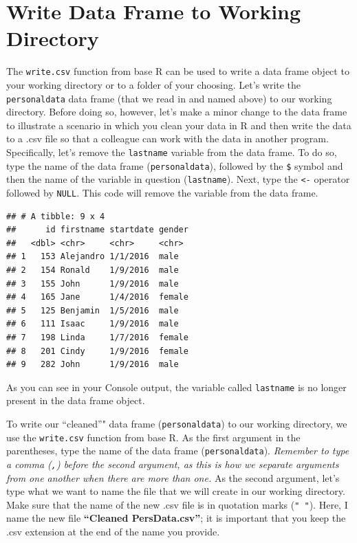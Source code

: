 \documentclass[]{book}
\newenvironment{Shaded}{\begin{snugshade}}{\end{snugshade}}
\newcommand{\StringTok}[1]{\textcolor[rgb]{0.31,0.60,0.02}{#1}}
\newcommand{\CommentTok}[1]{\textcolor[rgb]{0.56,0.35,0.01}{\textit{#1}}}
\newcommand{\OtherTok}[1]{\textcolor[rgb]{0.56,0.35,0.01}{#1}}
\newcommand{\OperatorTok}[1]{\textcolor[rgb]{0.81,0.36,0.00}{\textbf{#1}}}
\newcommand{\NormalTok}[1]{#1}
\begin{document}
\section{Write Data Frame to Working
Directory}\label{write-data-frame-to-working-directory}

The \texttt{write.csv} function from base R can be used to write a data
frame object to your working directory or to a folder of your choosing.
Let's write the \texttt{personaldata} data frame (that we read in and
named above) to our working directory. Before doing so, however, let's
make a minor change to the data frame to illustrate a scenario in which
you clean your data in R and then write the data to a .csv file so that
a colleague can work with the data in another program. Specifically,
let's remove the \texttt{lastname} variable from the data frame. To do
so, type the name of the data frame (\texttt{personaldata}), followed by
the \texttt{\$} symbol and then the name of the variable in question
(\texttt{lastname}). Next, type the \texttt{\textless{}-} operator
followed by \texttt{NULL}. This code will remove the variable from the
data frame.

\begin{Shaded}
\end{Shaded}

\begin{verbatim}
## # A tibble: 9 x 4
##      id firstname startdate gender
##   <dbl> <chr>     <chr>     <chr> 
## 1   153 Alejandro 1/1/2016  male  
## 2   154 Ronald    1/9/2016  male  
## 3   155 John      1/9/2016  male  
## 4   165 Jane      1/4/2016  female
## 5   125 Benjamin  1/5/2016  male  
## 6   111 Isaac     1/9/2016  male  
## 7   198 Linda     1/7/2016  female
## 8   201 Cindy     1/9/2016  female
## 9   282 John      1/9/2016  male
\end{verbatim}

As you can see in your Console output, the variable called
\texttt{lastname} is no longer present in the data frame object.

To write our ``cleaned''" data frame (\texttt{personaldata}) to our
working directory, we use the \texttt{write.csv} function from base R.
As the first argument in the parentheses, type the name of the data
frame (\texttt{personaldata}). \emph{Remember to type a comma
(\texttt{,}) before the second argument, as this is how we separate
arguments from one another when there are more than one.} As the second
argument, let's type what we want to name the file that we will create
in our working directory. Make sure that the name of the new .csv file
is in quotation marks (\texttt{"\ "}). Here, I name the new file
\textbf{``Cleaned PersData.csv''}; it is important that you keep the
.csv extension at the end of the name you provide.
\end{document}
